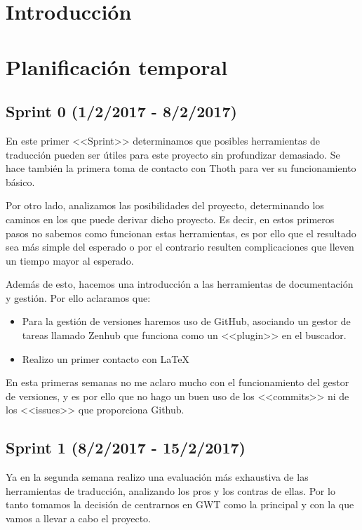 
\section{Introducción}

\section{Planificación temporal}

\subsection{Sprint 0 (1/2/2017 - 8/2/2017)}

En este primer <<Sprint>> determinamos que posibles herramientas de traducción pueden ser útiles para este proyecto sin profundizar demasiado. Se hace también la primera toma de contacto con Thoth para ver su funcionamiento básico.

Por otro lado, analizamos las posibilidades del proyecto, determinando los caminos en los que puede derivar dicho proyecto. Es decir, en estos primeros pasos no sabemos como funcionan estas herramientas, es por ello que el resultado sea más simple del esperado o por el contrario resulten complicaciones que lleven un tiempo mayor al esperado.

Además de esto, hacemos una introducción a las herramientas de documentación y gestión. Por ello aclaramos que:

\begin{itemize}
\item Para la gestión de versiones haremos uso de GitHub, asociando un gestor de tareas llamado Zenhub que funciona como un <<plugin>> en el buscador.
\item Realizo un primer contacto con \LaTeX 
\end{itemize}

En esta primeras semanas no me aclaro mucho con el funcionamiento del gestor de versiones, y es por ello que no hago un buen uso de los <<commits>> ni de los <<issues>> que proporciona Github.

\subsection{Sprint 1 (8/2/2017 - 15/2/2017)}

Ya en la segunda semana realizo una evaluación más exhaustiva de las herramientas de traducción, analizando los pros y los contras de ellas. Por lo tanto tomamos la decisión de centrarnos en GWT como la principal y con la que vamos a llevar a cabo el proyecto.

